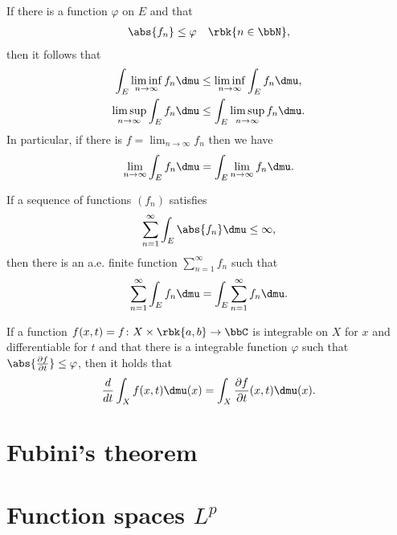 \documentclass[openany, a4paper, oneside]{jsbook}
\begin{document}
\begin{thm}
 If there is a function $\varphi$ on $E$ and that
 \begin{align}
  \abs{f_n} \leq \varphi \quad \rbk{n \in \bbN},
 \end{align}
 then it follows that
 \begin{align}
  \int_E \liminf_{n \to \infty} f_n \dmu
  &\leq
  \liminf_{n \to \infty} \int_E f_n \dmu, \\
  \limsup_{n \to \infty} \int_E f_n \dmu
  &\leq
  \int_E \limsup_{n \to \infty} f_n \dmu.
 \end{align}
 In particular, if there is $f = \lim_{n \to \infty} f_n$ then we have
 \begin{align}
  \lim_{n \to \infty} \int_E f_n \dmu
  =
  \int_E \lim_{n \to \infty} f_n \dmu.
 \end{align}
\end{thm}
\begin{thm}
 If a sequence of functions $(f_n)$ satisfies
 \begin{align}
  \sum_{n=1}^{\infty} \int_E \abs{f_n} \dmu
  \leq
  \infty,
 \end{align}
 then there is an a.e. finite function $\sum_{n=1}^{\infty} f_n$ such that
 \begin{align}
  \sum_{n=1}^{\infty} \int_E f_n \dmu
  =
  \int_E \sum_{n=1}^{\infty} f_n \dmu.
 \end{align}
\end{thm}
\begin{thm}
 If a function $f (x,t) = f \colon X \times \rbk{a, b} \to \bbC$ is integrable on $X$ for $x$ and differentiable for $t$
 and that there is a integrable function $\varphi$ such that $\abs{\frac{\partial f}{\partial t}} \leq \varphi$,
 then it holds that
 \begin{align}
  \frac{d}{dt} \int_X f (x, t) \dmu (x)
  =
  \int_X \frac{\partial f}{\partial t} (x, t) \dmu (x).
 \end{align}
\end{thm}
\section{Fubini's theorem}

\section{Function spaces $L^p$}
\end{document}

